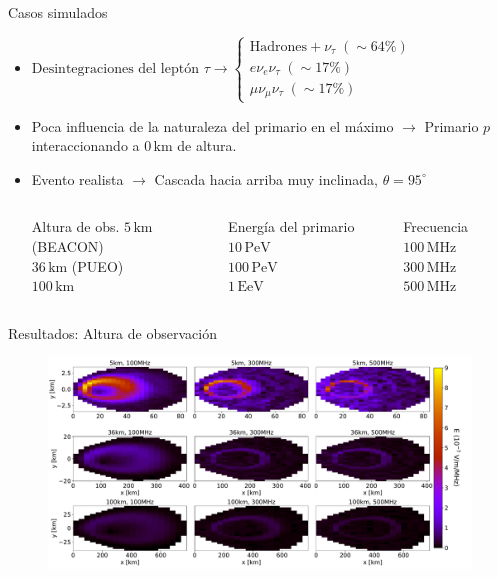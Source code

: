 \documentclass{beamer}
\begin{document}
\begin{frame}{Casos simulados}
	\begin{itemize}
		\item $\text{Desintegraciones del leptón } \tau\rightarrow\left\{\begin{array}{l}\text{Hadrones}+\nu_\tau\; (\sim64\%)\\e\nu_e\nu_\tau\;(\sim 17\%)\\\mu \nu_\mu\nu_\tau\;(\sim 17\%)\end{array}\right.$
		\item Poca influencia de la naturaleza del primario en el máximo $\rightarrow$ Primario $p$ interaccionando a $0\,\mathrm{km}$ de altura.
		\item Evento realista $\rightarrow$ Cascada hacia arriba muy inclinada, $\theta = 95^\circ$
		\pause\begin{columns}
			\begin{block}{\centering Altura de obs.}
				\centering $5\,\mathrm{km}$ (BEACON)\\$36\,\mathrm{km}$ (PUEO)\\$100\,\mathrm{km}$
			\end{block}
			\begin{block}{\centering Energía del primario}
				\centering $10\,\mathrm{PeV}$\\$100\,\mathrm{PeV}$\\$1\,\mathrm{EeV}$
			\end{block}

	\begin{block}{\centering Frecuencia}
		\centering $100\,\mathrm{MHz}$\\$300\,\mathrm{MHz}$\\$500\,\mathrm{MHz}$
	\end{block}
		\end{columns}
	\end{itemize}
\end{frame}

\begin{frame}{Resultados: Altura de observación}
	\begin{figure}[H]
		\centering
		\includegraphics[width=1\linewidth]{figures/Radio_UG/85deg_varh_5_36_100}
	\end{figure}
\end{frame}
\end{document}
